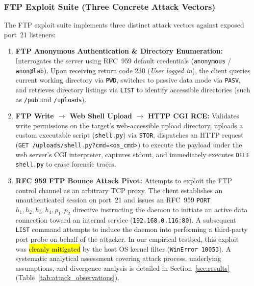 \subsubsection{FTP Exploit Suite (Three Concrete Attack Vectors)}
The FTP exploit suite implements three distinct attack vectors against exposed port~21 listeners:
\begin{enumerate}
    \item \textbf{FTP Anonymous Authentication \& Directory Enumeration:} Interrogates the server
    using RFC~959 default credentials (\texttt{anonymous} / \texttt{anon@lab}). Upon receiving
    return code 230 (\textit{User logged in}), the client queries current working directory via
    \texttt{PWD}, switches to passive data mode via \texttt{PASV}, and retrieves directory listings
    via \texttt{LIST} to identify accessible directories (such as \texttt{/pub} and \texttt{/uploads}).
    \item \textbf{FTP Write $\rightarrow$ Web Shell Upload $\rightarrow$ HTTP CGI RCE:} Validates
    write permissions on the target's web-accessible upload directory, uploads a custom executable
    script (\texttt{shell.py}) via \texttt{STOR}, dispatches an HTTP request
    (\texttt{GET /uploads/shell.py?cmd=<os\_cmd>}) to execute the payload under the web server's CGI
    interpreter, captures stdout, and immediately executes \texttt{DELE shell.py} to erase forensic
    traces.
    \item \textbf{RFC 959 FTP Bounce Attack Pivot:} Attempts to exploit the FTP control channel
    as an arbitrary TCP proxy. The client establishes an unauthenticated session on port~21 and issues
    an RFC~959 \texttt{PORT $h_1,h_2,h_3,h_4,p_1,p_2$} directive instructing the daemon to initiate
    an active data connection toward an internal service (\texttt{192.168.0.116:80}). A subsequent
    \texttt{LIST} command attempts to induce the daemon into performing a third-party port probe on behalf
    of the attacker. In our empirical testbed, this exploit was \hl{cleanly mitigated} by the host OS kernel
    filter (\texttt{WinError 10053}). A systematic analytical assessment covering attack process,
    underlying assumptions, and divergence analysis is detailed in
    Section~\ref{sec:results} (Table~\ref{tab:attack_observations}).
\end{enumerate}

